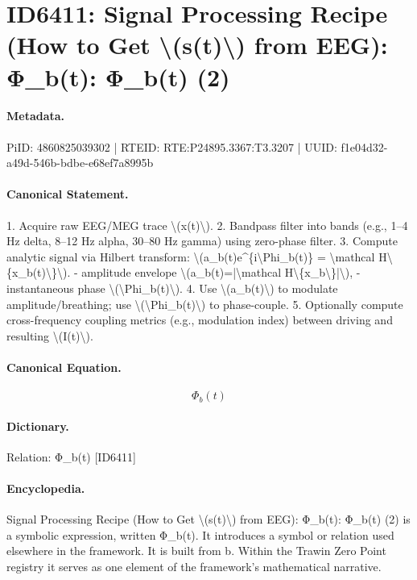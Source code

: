 \section*{ID6411: Signal Processing Recipe (How to Get \textbackslash{}(s(t)\textbackslash{}) from EEG): Φ\_b(t): Φ\_b(t) (2)}
\paragraph{Metadata.}
PiID: 4860825039302 | RTEID: RTE:P24895.3367:T3.3207 | UUID: f1e04d32-a49d-546b-bdbe-e68ef7a8995b

\paragraph{Canonical Statement.}
1. Acquire raw EEG/MEG trace \textbackslash{}(x(t)\textbackslash{}). 2. Bandpass filter into bands (e.g., 1–4 Hz delta, 8–12 Hz alpha, 30–80 Hz gamma) using zero-phase filter. 3. Compute analytic signal via Hilbert transform: \textbackslash{}(a\_b(t)e\textasciicircum{}\{i\textbackslash{}Phi\_b(t)\} = \textbackslash{}mathcal H\textbackslash{}\{x\_b(t)\textbackslash{}\}\textbackslash{}). - amplitude envelope \textbackslash{}(a\_b(t)=|\textbackslash{}mathcal H\textbackslash{}\{x\_b\textbackslash{}\}|\textbackslash{}), - instantaneous phase \textbackslash{}(\textbackslash{}Phi\_b(t)\textbackslash{}). 4. Use \textbackslash{}(a\_b(t)\textbackslash{}) to modulate amplitude/breathing; use \textbackslash{}(\textbackslash{}Phi\_b(t)\textbackslash{}) to phase-couple. 5. Optionally compute cross-frequency coupling metrics (e.g., modulation index) between driving and resulting \textbackslash{}(I(t)\textbackslash{}).

\paragraph{Canonical Equation.}
\[
\Phi_b(t)
\]

\paragraph{Dictionary.}
Relation: Φ\_b(t) [ID6411]

\paragraph{Encyclopedia.}
Signal Processing Recipe (How to Get \textbackslash{}(s(t)\textbackslash{}) from EEG): Φ\_b(t): Φ\_b(t) (2) is a symbolic expression, written Φ\_b(t). It introduces a symbol or relation used elsewhere in the framework. It is built from b. Within the Trawin Zero Point registry it serves as one element of the framework's mathematical narrative.
